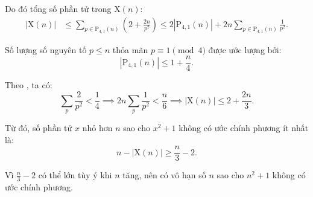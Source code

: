 \documentclass[../08-quadratic-residues.tex]{subfiles}
\begin{document}
\begin{soln}
	Do đó tổng số phần tử trong \( \text{X}(n) \):
	\[
		\begin{aligned}
			|\text{X}(n)| &\le \sum_{p\in\text{P}_{4,1}(n)} \left(2 + \frac{2n}{p^2} \right)
			\le 2|\text{P}_{4,1}(n)|  + 2n \sum_{p\in\text{P}_{4,1}(n)} \frac{1}{p^2}.
		\end{aligned}
	\]

	Số lượng số nguyên tố \( p \leq n \) thỏa mãn \( p \equiv 1 \pmod{4} \) được ước lượng bởi:
	\[
		|\text{P}_{4,1}(n)| \leq 1 + \frac{n}{4}.
	\]

	Theo , ta có:
	\[
		\sum_{p} \frac{2}{p^2} < \frac{1}{4} \implies 2n\sum_{p} \frac{1}{p^2} < \frac{n}{6} \implies |\text{X}(n)| \leq 2 + \frac{2n}{3}.
	\]
	
	Từ đó, số phần tử \( x \) nhỏ hơn \( n \) sao cho \( x^2 + 1 \) không có ước chính phương ít nhất là:
	\[
		n - |\text{X}(n)| \geq \frac{n}{3} - 2.
	\]

	Vì \( \frac{n}{3} - 2 \) có thể lớn tùy ý khi \( n \) tăng, nên có vô hạn số \( n \) sao cho \( n^2 + 1 \) không có ước chính phương.
\end{soln}

\end{document}
